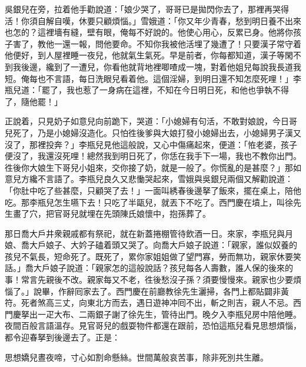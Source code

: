 吳銀兒在旁，拉着他手勸說道：「娘少哭了，哥哥已是拋閃你去了，那裡再哭得活！你須自解自嘆，休要只顧煩惱。」雪娥道：「你又年少青春，愁到明日養不出來也怎的？這裡墻有縫，壁有眼，俺每不好說的。他使心用心，反累已身。他將你孩子害了，教他一還一報，問他要命。不知你我被他活埋了幾遭了！只要漢子常守着他便好，到人屋裡睡一夜兒，他就氣生氣死。早是前者，你每都知道，漢子等閑不到我後邊，纔到了一遭兒，你看他就背地裡唧喳成一塊，對着他姐兒每說我長道我短。俺每也不言語，每日洗眼兒看着他。這個淫婦，到明日還不知怎麼死哩！」{}李瓶兒道：「罷了，我也惹了一身病在這裡，不知在今日明日死，和他也爭執不得了，隨他罷！」

正說着，只見奶子如意兒向前跪下，哭道：「小媳婦有句活，不敢對娘說，今日哥兒死了，乃是小媳婦沒造化。只怕徃後爹與大娘打發小媳婦出去，小媳婦男子漢又沒了，那裡投奔？」李瓶兒見他這般說，又心中傷痛起來，便道：「恠老婆，孩子便沒了，我還沒死哩！總然我到明日死了，你恁在我手下一場，我也不教你出門。徃後你大娘生下哥兒小姐來，交你接了奶，就是一般了。你慌亂的是甚麼？」那如意兒方纔不言語了。李瓶兒良久又悲慟哭起來，雪娥與吳銀兒兩個又解勸說道：「你肚中吃了些甚麼，只顧哭了去！」一面叫綉春後邊拏了飯來，擺在桌上，陪他吃。那李瓶兒怎生嚥下去！只吃了半甌兒，就丟下不吃了。西門慶在墳上，叫徐先生畫了穴，把官哥兒就埋在先頭陳氏娘懷中，抱孫葬了。

那日喬大戶井衆親戚都有祭祀，就在新蓋捲棚管待飲酒一日。來家，李瓶兒與月娘、喬大戶娘子、大妗子磕着頭又哭了。向喬大戶娘子說道：「親家，誰似奴養的孩兒不氣長，短命死了。既死了，累你家姐姐做了望門寡，勞而無功，親家休要笑話。」喬大戶娘子說道：「親家怎的這般說話？孩兒每各人壽數，誰人保的後來的事！常言先親後不改。親家每又不老，徃後愁沒子孫？須要慢慢來。親家也少要煩惱了。」說畢，作辭囘家去了。西門慶在前廳教徐先生灑掃，各門上都貼闢非黃符。死者煞高三丈，向東北方而去，遇日遊神冲囘不出，斬之則吉，親人不忌。西門慶拏出一疋大布、二兩銀子謝了徐先生，管待出門。晚夕入李瓶兒房中陪他睡。夜間百般言語溫存。見官哥兒的戲耍物件都還在跟前，恐怕這瓶兒看見思想煩惱，都令迎春拏到後邊去了。正是：

思想嬌兒晝夜啼，寸心如割命懸絲。世間萬般哀苦事，除非死別共生離。

